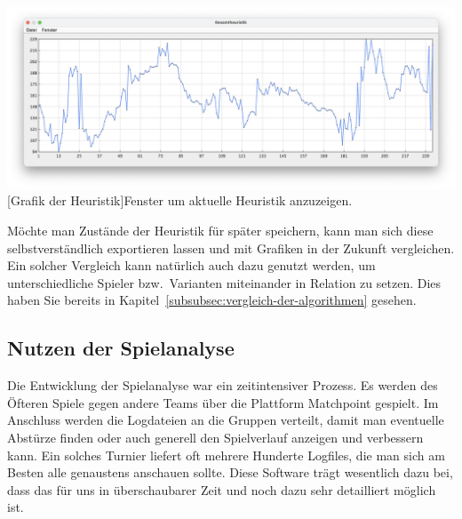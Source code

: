 \vspace{1em}
\begin{minipage}{\linewidth}
    \centering
    \includegraphics[width=0.8\linewidth]{pics/heuristic}
    [Grafik der Heuristik]{Fenster um aktuelle Heuristik anzuzeigen.}
    \label{fig:heuristic}
\end{minipage}

M\"ochte man Zust\"ande der Heuristik f\"ur sp\"ater speichern, kann man sich diese selbstverst\"andlich exportieren lassen und mit Grafiken in der Zukunft vergleichen.
Ein solcher Vergleich kann nat\"urlich auch dazu genutzt werden, um unterschiedliche Spieler bzw.\ Varianten miteinander in Relation zu setzen.
Dies haben Sie bereits in Kapitel~\ref{subsubsec:vergleich-der-algorithmen} gesehen.

\subsection{Nutzen der Spielanalyse}\label{subsec:nutzen-der-spielanalyse}
Die Entwicklung der Spielanalyse war ein zeitintensiver Prozess.
Es werden des \"Ofteren Spiele gegen andere Teams \"uber die Plattform Matchpoint gespielt.
Im Anschluss werden die Logdateien an die Gruppen verteilt, damit man eventuelle Abst\"urze finden oder auch generell den Spielverlauf anzeigen und verbessern kann.
Ein solches Turnier liefert oft mehrere Hunderte Logfiles, die man sich am Besten alle genaustens anschauen sollte.
Diese Software tr\"agt wesentlich dazu bei, dass das f\"ur uns in \"uberschaubarer Zeit und noch dazu sehr detailliert m\"oglich ist.


\bigskip
\newpage